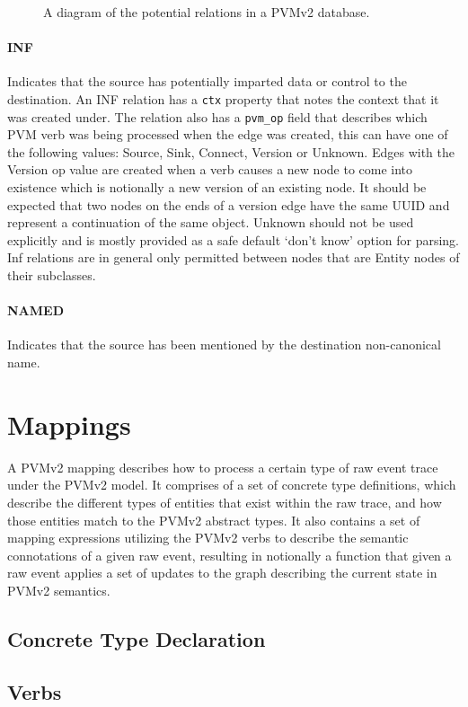 \documentclass[12pt,twoside,a4paper]{article}
\newcommand{\field}[1]{\texttt{#1}}
\newcommand{\para}[1]{\paragraph{#1\\}}
\begin{document}
\begin{figure}[h]
\centering

\caption{A diagram of the potential relations in a PVMv2 database.}
\label{fig:rels}
\end{figure}

\para{INF}
\label{sec:gs:rel:inf}
Indicates that the source has potentially imparted data or control to the destination. An INF relation has a \field{ctx} property that notes the context that it was created under. The relation also has a \field{pvm\_op} field that describes which PVM verb was being processed when the edge was created, this can have one of the following values: Source, Sink, Connect, Version or Unknown. Edges with the Version op value are created when a verb causes a new node to come into existence which is notionally a new version of an existing node. It should be expected that two nodes on the ends of a version edge have the same UUID and represent a continuation of the same object. Unknown should not be used explicitly and is mostly provided as a safe default `don't know' option for parsing. Inf relations are in general only permitted between nodes that are Entity nodes of their subclasses.

\para{NAMED}
\label{sec:gs:rel:named}
Indicates that the source has been mentioned by the destination non-canonical name.

\section{Mappings}
\label{sec:map}
A PVMv2 mapping describes how to process a certain type of raw event trace under the PVMv2 model. It comprises of a set of concrete type definitions, which describe the different types of entities that exist within the raw trace, and how those entities match to the PVMv2 abstract types. It also contains a set of mapping expressions utilizing the PVMv2 verbs to describe the semantic connotations of a given raw event, resulting in notionally a function that given a raw event applies a set of updates to the graph describing the current state in PVMv2 semantics.

\subsection{Concrete Type Declaration}
\label{sec:map:tydef}

\subsection{Verbs}
\label{sec:map:verbs}
\end{document}
